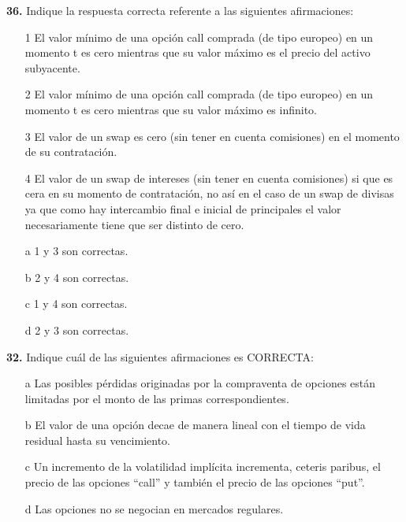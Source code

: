 \documentclass{nuevotema}
\begin{document}

\textbf{36.} Indique la respuesta correcta referente a las siguientes afirmaciones:

\begin{itemize}
	\item[1] El valor mínimo de una opción call comprada (de tipo europeo) en un momento t es cero mientras que su valor máximo es el precio del activo subyacente.
	\item[2] El valor mínimo de una opción call comprada (de tipo europeo) en un momento t es cero mientras que su valor máximo es infinito.
	\item[3] El valor de un swap es cero (sin tener en cuenta comisiones) en el momento de su contratación.
	\item[4] El valor de un swap de intereses (sin tener en cuenta comisiones) si que es cera en su momento de contratación, no así en el caso de un swap de divisas ya que como hay intercambio final e inicial de principales el valor necesariamente tiene que ser distinto de cero.
\end{itemize}

\begin{itemize}
	\item[a] 1 y 3 son correctas.
	\item[b] 2 y 4 son correctas.
	\item[c] 1 y 4 son correctas.
	\item[d] 2 y 3 son correctas.
\end{itemize}


\textbf{32.} Indique cuál de las siguientes afirmaciones es CORRECTA:

\begin{itemize}
	\item[a] Las posibles pérdidas originadas por la compraventa de opciones están limitadas por el monto de las primas correspondientes.
	\item[b] El valor de una opción decae de manera lineal con el tiempo de vida residual hasta su vencimiento.
	\item[c] Un incremento de la volatilidad implícita incrementa, ceteris paribus, el precio de las opciones ``call'' y también el precio de las opciones ``put''.
	\item[d] Las opciones no se negocian en mercados regulares. 
\end{itemize}

\end{document}
